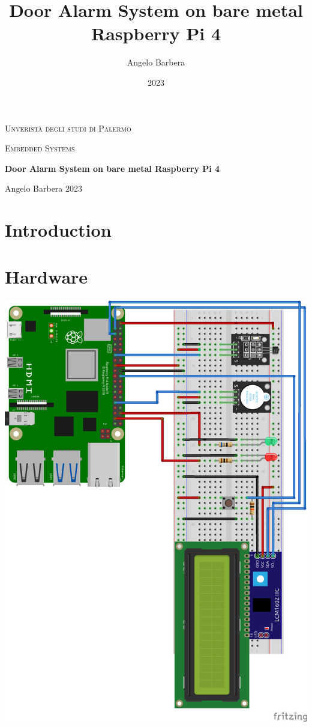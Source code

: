 \documentclass{article}
\title{\huge Door Alarm System on bare metal Raspberry Pi 4}
\author{Angelo Barbera}
\date{2023}
\begin{document}
\begin{titlepage}
	\centering
	{\scshape\LARGE Unveristà degli studi di Palermo \par}
	\vspace{0.6cm}
	{\scshape\Large Embedded Systems \par}
	\vspace{1.8cm}
	{\huge\bfseries Door Alarm System on bare metal Raspberry Pi 4 \par}
	\vspace{2cm}
	\vfill
	{\large Angelo Barbera 2023 \par}
\end{titlepage}
\newpage
{}
\tableofcontents
\newpage
\clearpage{}


\section{Introduction}

\section{Hardware}

\includegraphics{breadboard.png}
\end{document}
